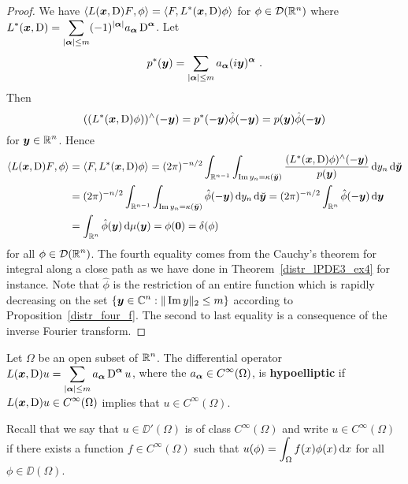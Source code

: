 \begin{proof}
 We have
$\displaystyle \left\langle{L({\bm{x}},\operatorname{D}) F} , {\phi}\right\rangle
= \left\langle{F} , {L^\ast({\bm{x}},\operatorname{D}) \phi}\right\rangle$
for $\phi \in \mathcal{D}(\mathbb{R}^n)$ where
$\displaystyle L^\ast({\bm{x}},\operatorname{D})
= \sum_{|{\bm{\alpha}}|\leq m} (-1)^{|{\bm{\alpha}}|} a_{{\bm{\alpha}}}
\operatorname{D}^{{\bm{\alpha}}}$.
Let
\[
p^\ast({\bm{y}}) = \sum_{|{\bm{\alpha}}|\leq m}
a_{{\bm{\alpha}}} (i {\bm{y}})^{{\bm{\alpha}}} \ .
\]
Then
\[
((L^\ast({\bm{x}},\operatorname{D}) \phi))^\wedge(-{\bm{y}})
= p^\ast(-{\bm{y}}) \hat{\phi}(-{\bm{y}})
= p({\bm{y}}) \hat{\phi}(-{\bm{y}})
\]
for $\displaystyle {\bm{y}}\in \mathbb{R}^n$.  Hence
\begin{align*}
\left\langle{L({\bm{x}},\operatorname{D})F} , {\phi}\right\rangle &= \left\langle{F} , {L^\ast({\bm{x}},\operatorname{D})\phi}\right\rangle
= (2\pi)^{-n/2} \int_{\mathbb{R}^{n-1}} \int_{\operatorname{Im} y_n = \kappa(\breve{{\bm{y}}})}
\frac{(L^\ast({\bm{x}},\operatorname{D})\phi)^\wedge(-{\bm{y}})}{p({\bm{y}})}
\,\mathrm{d}{y_n}\,\mathrm{d}{\breve{{\bm{y}}}} \\
&= (2\pi)^{-n/2} \int_{\mathbb{R}^{n-1}} \int_{\operatorname{Im} y_n = \kappa(\breve{{\bm{y}}})}
\hat{\phi}(-{\bm{y}}) \,\mathrm{d}{y_n}\,\mathrm{d}{\breve{{\bm{y}}}}
= (2\pi)^{-n/2} \int_{\mathbb{R}^n} \hat{\phi}(-{\bm{y}}) \,\mathrm{d}{{\bm{y}}} \\
&= \int_{\mathbb{R}^n} \hat{\phi}({\bm{y}}) \,\mathrm{d}{\mu({\bm{y}})}
= \phi({\bm{0}}) = \delta(\phi)
\end{align*}
for all $\displaystyle \phi \in \mathcal{D}(\mathbb{R}^n)$.  The fourth equality comes from
the Cauchy's theorem for integral along a close path as we have done 
in Theorem~\ref{distr_lPDE3_ex4} for instance.
Note that $\hat{\phi}$ is the restriction of an entire function which
is rapidly decreasing on the set
$\displaystyle \{ {\bm{y}} \in \mathbb{C}^n : \|\operatorname{Im} y\|_2 \leq m \}$ according to 
Proposition~\ref{distr_four_f}.  The second to last
equality is a consequence of the inverse Fourier transform.
\end{proof}

\begin{defn}
Let $\Omega$ be an open subset of $\displaystyle \mathbb{R}^n$.  The
differential operator
$\displaystyle L({\bm{x}},\operatorname{D})u = \sum_{|{\bm{\alpha}}|\leq m}
a_{{\bm{\alpha}}} \operatorname{D}^{{\bm{\alpha}}} u$,
where the $\displaystyle a_{{\bm{\alpha}}}\in C^\infty(\Omega)$, is
{\bfseries hypoelliptic}%
 if
$\displaystyle L({\bm{x}},\operatorname{D})u \in C^\infty(\Omega)$ implies that
$\displaystyle u \in C^\infty(\Omega)$.
\end{defn}

Recall that we say that $u \in \DD'(\Omega)$ is of class
$\displaystyle C^\infty(\Omega)$ and write
$\displaystyle u \in C^\infty(\Omega)$ if there exists
a function $\displaystyle f \in C^\infty(\Omega)$ such that
$\displaystyle u(\phi) = \int_{\Omega} f(x) \phi(x) \,\mathrm{d}{x}$
for all $\phi \in \DD(\Omega)$.


